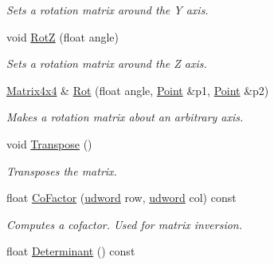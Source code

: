 \begin{DoxyCompactItemize}
\begin{DoxyCompactList}\small\item\em Sets a rotation matrix around the Y axis. \end{DoxyCompactList}\item 
void \hyperlink{classOpcode_1_1Matrix4x4_acf110cf47a3dd301a3a04728d0b1f4c3}{RotZ} (float angle)\hypertarget{classOpcode_1_1Matrix4x4_acf110cf47a3dd301a3a04728d0b1f4c3}{}\label{classOpcode_1_1Matrix4x4_acf110cf47a3dd301a3a04728d0b1f4c3}

\begin{DoxyCompactList}\small\item\em Sets a rotation matrix around the Z axis. \end{DoxyCompactList}\item 
\hyperlink{classOpcode_1_1Matrix4x4}{Matrix4x4} \& \hyperlink{classOpcode_1_1Matrix4x4_a546dc008a834c4b99a658d056b1ca433}{Rot} (float angle, \hyperlink{classOpcode_1_1Point}{Point} \&p1, \hyperlink{classOpcode_1_1Point}{Point} \&p2)\hypertarget{classOpcode_1_1Matrix4x4_a546dc008a834c4b99a658d056b1ca433}{}\label{classOpcode_1_1Matrix4x4_a546dc008a834c4b99a658d056b1ca433}

\begin{DoxyCompactList}\small\item\em Makes a rotation matrix about an arbitrary axis. \end{DoxyCompactList}\item 
void \hyperlink{classOpcode_1_1Matrix4x4_a190c2a75b0db42c46a9a1986a8d4304d}{Transpose} ()\hypertarget{classOpcode_1_1Matrix4x4_a190c2a75b0db42c46a9a1986a8d4304d}{}\label{classOpcode_1_1Matrix4x4_a190c2a75b0db42c46a9a1986a8d4304d}

\begin{DoxyCompactList}\small\item\em Transposes the matrix. \end{DoxyCompactList}\item 
float \hyperlink{classOpcode_1_1Matrix4x4_afc8239c94e440436630123a1ac2b24df}{Co\+Factor} (\hyperlink{IceTypes_8h_a44c6f1920ba5551225fb534f9d1a1733}{udword} row, \hyperlink{IceTypes_8h_a44c6f1920ba5551225fb534f9d1a1733}{udword} col) const \hypertarget{classOpcode_1_1Matrix4x4_afc8239c94e440436630123a1ac2b24df}{}\label{classOpcode_1_1Matrix4x4_afc8239c94e440436630123a1ac2b24df}

\begin{DoxyCompactList}\small\item\em Computes a cofactor. Used for matrix inversion. \end{DoxyCompactList}\item 
float \hyperlink{classOpcode_1_1Matrix4x4_a0c106185086895c738f6dd356096df64}{Determinant} () const \hypertarget{classOpcode_1_1Matrix4x4_a0c106185086895c738f6dd356096df64}{}\label{classOpcode_1_1Matrix4x4_a0c106185086895c738f6dd356096df64}


\end{DoxyCompactItemize}
